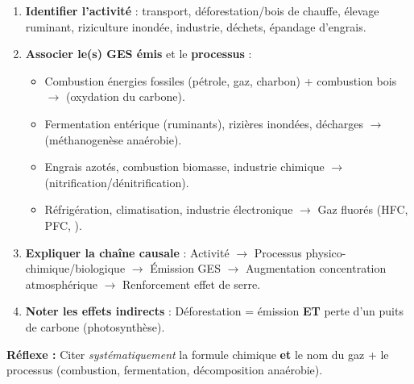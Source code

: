 \documentclass[11pt]{article}
\begin{document}
\begin{methode}
\begin{enumerate}
\item \textbf{Identifier l'activité} : transport, déforestation/bois de chauffe, élevage ruminant, riziculture inondée, industrie, déchets, épandage d'engrais.
\item \textbf{Associer le(s) GES émis} et le \textbf{processus} :
\begin{itemize}
\item Combustion énergies fossiles (pétrole, gaz, charbon) + combustion bois $\rightarrow$  (oxydation du carbone).
\item Fermentation entérique (ruminants), rizières inondées, décharges $\rightarrow$  (méthanogenèse anaérobie).
\item Engrais azotés, combustion biomasse, industrie chimique $\rightarrow$  (nitrification/dénitrification).
\item Réfrigération, climatisation, industrie électronique $\rightarrow$ Gaz fluorés (HFC, PFC, ).
\end{itemize}
\item \textbf{Expliquer la chaîne causale} : Activité $\rightarrow$ Processus physico-chimique/biologique $\rightarrow$ Émission GES $\rightarrow$ Augmentation concentration atmosphérique $\rightarrow$ Renforcement effet de serre.
\item \textbf{Noter les effets indirects} : Déforestation = émission  \textbf{ET} perte d'un puits de carbone (photosynthèse).
\end{enumerate}
\textbf{Réflexe :} Citer \emph{systématiquement} la formule chimique \textbf{et} le nom du gaz + le processus (combustion, fermentation, décomposition anaérobie).
\end{methode}
\end{document}
